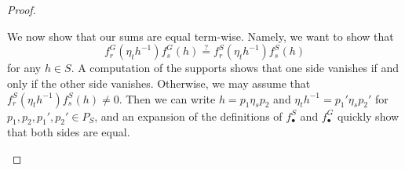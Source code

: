 \begin{proof}
\begin{itemize}

        We now show that our sums are equal term-wise. Namely, we want to show that
        \[f_r^G\left(\eta_th^{-1}\right)f_s^G(h)\stackrel?=f_r^S\left(\eta_th^{-1}\right)f_s^S(h)\]
        for any $h\in S$. A computation of the supports shows that one side vanishes if and only if the other side vanishes. Otherwise,
        we may assume that $f_r^S\left(\eta_th^{-1}\right)f_s^S(h)\ne0$. Then we can write $h=p_1\eta_sp_2$ and $\eta_th^{-1}=p_1'\eta_sp_2'$ for $p_1,p_2,p_1',p_2'\in P_S$, and an expansion of the definitions of $f_\bullet^S$ and $f_\bullet^G$ quickly show that both sides are equal.
        \qedhere
    \end{itemize}
\end{proof}
